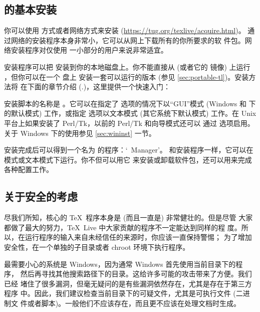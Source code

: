 \documentclass{article}
\begin{document}
\subsection{\protect\TL{} 的基本安装}
\label{sec:basic}

你可以使用 \DVD{} 方式或者网络方式来安装 \TL{}
(\url{https://tug.org/texlive/acquire.html})。
通过网络的安装程序本身非常小，它可以从网上下载所有的你所要求的软
件包。网络安装程序对仅使用 \TL{} 一小部分的用户来说非常适宜。

\DVD{} 安装程序可以把 \TL{} 安装到你的本地磁盘上。你不能直接从 \TK{}
\DVD{} (或者它的  镜像) 上运行 \TL{}，但你可以在一个 \USB{} 盘上
安装一套可以运行的版本 (参见 \ref{sec:portable-tl})。安装方法将
在下面的章节介绍 (\p.\pageref{sec:install})，这里提供一个快速入门：

\begin{itemize*}

  \item 安装脚本的名称是 。它可以在指定了
   选项的情况下以“GUI”模式 (Windows 和 \MacOSX{} 下的默认模式)
  工作，或指定  选项以文本模式 (其它系统下默认模式)
  工作。在 Unix 平台上如果安装了 Perl/Tk，以前的 Perl/Tk 和向导模式还可以
  通过  选项启用。关于 Windows 下的使用参见
  \ref{sec:wininst} 一节。

  \item 安装完成后可以得到一个名为  的程序：`\TL\ Manager'。
  和安装程序一样，它可以在 \GUI{} 模式或文本模式下运行。你不但可以用它
  来安装或卸载软件包，还可以用来完成各种配置工作。

\end{itemize*}

\subsection{关于安全的考虑}
\label{sec:security}

尽我们所知，核心的 \TeX\ 程序本身是 (而且一直是) 非常健壮的。但是尽管
大家都做了最大的努力，\TeX\ Live 中大家贡献的程序不一定能达到同样的程
度。所以，在运行程序的输入来自未经信任的来源时，你应该一直保持警惕；
为了增加安全性，在一个单独的子目录或者 chroot 环境下执行程序。

最需要小心的系统是 Windows，因为通常 Windows 首先使用当前目录下的程序，
然后再寻找其他搜索路径下的目录。这给许多可能的攻击带来了方便。我们已经
堵住了很多漏洞，但毫无疑问的是有些漏洞依然存在，尤其是存在于第三方程序
中。因此，我们建议检查当前目录下的可疑文件，尤其是可执行文件 (二进制文
件或者脚本)。一般他们不应该存在，而且更不应该在处理文档时生成。
\end{document}
